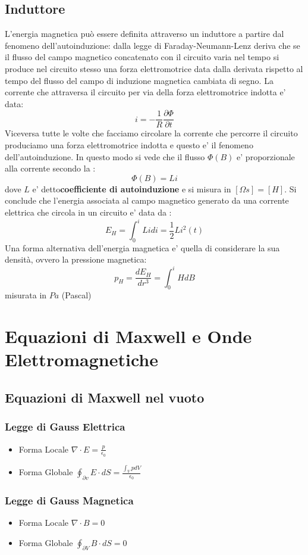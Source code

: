 \documentclass[a4paper, 10pt]{article}
\begin{document}
		\subsection{Induttore}
			L'energia magnetica può essere definita attraverso un induttore a partire dal fenomeno dell'autoinduzione: dalla
			legge di Faraday-Neumann-Lenz deriva che se il flusso del campo magnetico concatenato con il circuito varia nel tempo si
			produce nel circuito stesso una forza elettromotrice data dalla derivata rispetto al tempo del flusso del campo di 
			induzione magnetica cambiata di segno. La corrente che attraversa il circuito per via della forza elettromotrice
			indotta e' data:
			\[ i = -\frac{1}{R}\frac{\partial \Phi}{\partial t} \]
			Viceversa tutte le volte che facciamo circolare la corrente che percorre il circuito produciamo una forza elettromotrice 
			indotta e questo e' il fenomeno dell'autoinduzione. In questo modo si vede che il flusso $\Phi(B)$ e' proporzionale
			alla corrente secondo la :
			\[ \Phi(B) = Li \] dove $L$ e' detto\textbf{coefficiente di autoinduzione} e si misura in $[ \Omega s ] = [H]$. 
			Si conclude che l'energia associata al campo magnetico generato da una corrente elettrica che circola in un 
			circuito e' data da :
			\[ E_H = \int^i _0 Li di = \frac{1}{2}Li^2 (t) \]
			Una forma alternativa dell'energia magnetica e' quella di considerare la sua densità, ovvero la pressione magnetica:
			\[ p_H = \frac{dE_H}{dr^3} = \int^i _0 H dB \] misurata in $Pa$ (Pascal)
			
		
	\newpage
	\section{Equazioni di Maxwell e Onde \\ Elettromagnetiche}
		\subsection{Equazioni di Maxwell nel vuoto}
			\subsubsection{Legge di Gauss Elettrica}
				\begin{itemize}
					\item Forma Locale $ \nabla \cdot E = \frac{p}{\epsilon_0}$
					\item Forma Globale $ \oint_{\partial v} E \cdot dS = \frac{\int_V p dV}{\epsilon_0}$
				\end{itemize}
			\subsubsection{Legge di Gauss Magnetica}
				\begin{itemize}
					\item Forma Locale $\nabla \cdot B = 0$
					\item Forma Globale $\oint_{\partial V} B \cdot dS = 0$
				\end{itemize}
\end{document}

